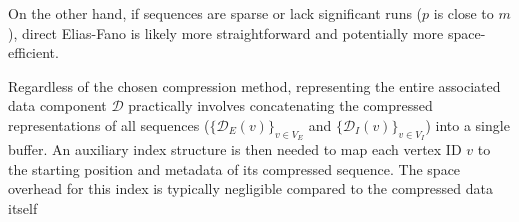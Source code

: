 On the other hand, if sequences are sparse or lack significant runs ($p$ is close to $m$), direct Elias-Fano is likely more straightforward and potentially more space-efficient.

Regardless of the chosen compression method, representing the entire associated data component $\mathcal{D}$ practically involves concatenating the compressed representations of all sequences ($\{\mathcal{D}_E(v)\}_{v \in V_E}$ and $\{\mathcal{D}_I(v)\}_{v \in V_I}$) into a single buffer. An auxiliary index structure is then needed to map each vertex ID $v$ to the starting position and metadata of its compressed sequence. The space overhead for this index is typically negligible compared to the compressed data itself
